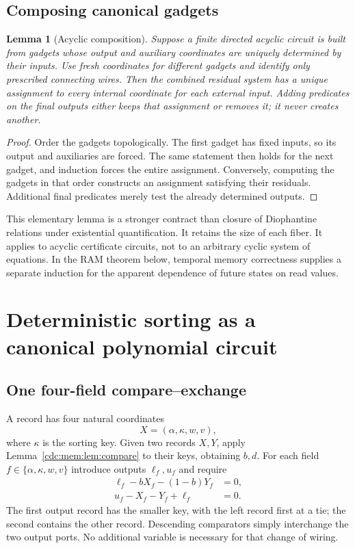 \documentclass[11pt,a4paper]{article}
\newtheorem{lemma}[lemma]{Lemma}
\theoremstyle{definition}
\theoremstyle{remark}
\newcommand{\srctag}[1]{\texorpdfstring{\hspace{0.5em}{\normalfont\small\color{accent}[#1]}}{ [#1]}}
\begin{document}
\subsection{Composing canonical gadgets}
\begin{lemma}[Acyclic composition]\label{cdc:mem:lem:composition}
Suppose a finite directed acyclic circuit is built from gadgets whose output
and auxiliary coordinates are uniquely determined by their inputs. Use fresh
coordinates for different gadgets and identify only prescribed connecting
wires. Then the combined residual system has a unique assignment to every
internal coordinate for each external input. Adding predicates on the final
outputs either keeps that assignment or removes it; it never creates another.
\end{lemma}
\begin{proof}
Order the gadgets topologically. The first gadget has fixed inputs, so its
output and auxiliaries are forced. The same statement then holds for the next
gadget, and induction forces the entire assignment. Conversely, computing the
gadgets in that order constructs an assignment satisfying their residuals.
Additional final predicates merely test the already determined outputs.
\end{proof}

This elementary lemma is a stronger contract than closure of Diophantine
relations under existential quantification. It retains the size of each fiber.
It applies to acyclic certificate circuits, not to an arbitrary cyclic system
of equations. In the RAM theorem below, temporal memory correctness supplies a
separate induction for the apparent dependence of future states on read values.

\section{Deterministic sorting as a canonical polynomial circuit\srctag{03}}
\subsection{One four-field compare--exchange}
A record has four natural coordinates
\begin{equation}
 X=(\alpha,\kappa,w,v),
\end{equation}
where $\kappa$ is the sorting key. Given two records $X,Y$, apply
Lemma~\ref{cdc:mem:lem:compare} to their keys, obtaining $b,d$. For each field
$f\in\{\alpha,\kappa,w,v\}$ introduce outputs $\ell_f,u_f$ and require
\begin{align}
 \ell_f-bX_f-(1-b)Y_f&=0,\label{cdc:mem:eq:record-low}\\
 u_f-X_f-Y_f+\ell_f&=0.\label{cdc:mem:eq:record-high}
\end{align}
The first output record has the smaller key, with the left record first at a
tie; the second contains the other record. Descending comparators simply
interchange the two output ports. No additional variable is necessary for that
change of wiring.
\end{document}
